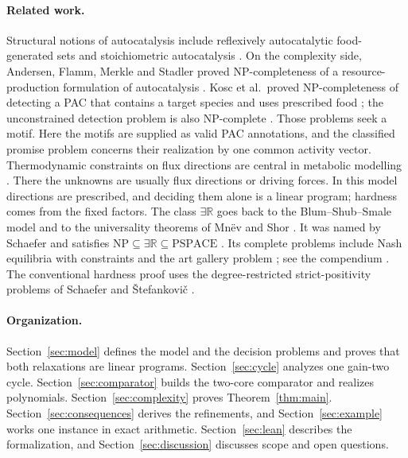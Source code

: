 \documentclass[11pt,a4paper]{article}
\theoremstyle{plain}
\theoremstyle{definition}
\theoremstyle{remark}
\newcommand{\ER}{\exists\mathbb{R}}
\begin{document}
\paragraph{Related work.}
Structural notions of autocatalysis include reflexively autocatalytic food-generated sets \citep{kauffman1986,hordijk2004} and stoichiometric autocatalysis \citep{blokhuis2020,gagrani2024,unterberger2022,despons2024}. On the complexity side, Andersen, Flamm, Merkle and Stadler proved NP-completeness of a resource-production formulation of autocatalysis \citep{andersen2012}. Kosc et al.\ proved NP-completeness of detecting a PAC that contains a target species and uses prescribed food \citep{kosc2025}; the unconstrained detection problem is also NP-complete \citep{pacnp2026}. Those problems seek a motif. Here the motifs are supplied as valid PAC annotations, and the classified promise problem concerns their realization by one common activity vector. Thermodynamic constraints on flux directions are central in metabolic modelling \citep{beard2004,schellenberger2011,noor2014}. There the unknowns are usually flux directions or driving forces. In this model directions are prescribed, and deciding them alone is a linear program; hardness comes from the fixed factors. The class $\ER$ goes back to the Blum--Shub--Smale model \citep{bss1989} and to the universality theorems of Mnëv and Shor \citep{mnev1988,shor1991}. It was named by Schaefer \citep{schaefer2009} and satisfies $\mathrm{NP}\subseteq\ER\subseteq\mathrm{PSPACE}$ \citep{canny1988}. Its complete problems include Nash equilibria with constraints \citep{garg2018} and the art gallery problem \citep{abrahamsen2022}; see the compendium \citep{compendium2024}. The conventional hardness proof uses the degree-restricted strict-positivity problems of Schaefer and Štefankovič \citep{schaefer2017,schaefer2024}.

\paragraph{Organization.}
Section~\ref{sec:model} defines the model and the decision problems and proves that both relaxations are linear programs. Section~\ref{sec:cycle} analyzes one gain-two cycle. Section~\ref{sec:comparator} builds the two-core comparator and realizes polynomials. Section~\ref{sec:complexity} proves Theorem~\ref{thm:main}. Section~\ref{sec:consequences} derives the refinements, and Section~\ref{sec:example} works one instance in exact arithmetic. Section~\ref{sec:lean} describes the formalization, and Section~\ref{sec:discussion} discusses scope and open questions.
\end{document}
